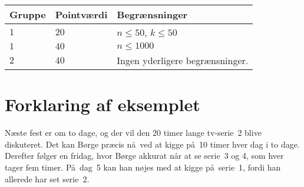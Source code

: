 \noindent
\begin{tabular}{| l | l | l |}
\hline
Gruppe & Pointværdi & Begrænsninger \\ \hline
$1$   & $20$       & $n \leq 50$, $k \leq 50$ \\ \hline
$1$   & $40$       & $n \leq 1000$ \\ \hline
$2$   & $40$       & Ingen yderligere begrænsninger. \\ \hline
\end{tabular}

\section*{Forklaring af eksemplet}
Næste fest er om to dage, og der vil den 20 timer lange tv-serie~2 blive diskuteret.
Det kan Børge præcis nå ved at kigge på 10 timer hver dag i to dage.
Derefter følger en fridag, hvor Børge akkurat når at se serie~3 og 4, som hver tager fem timer.
På dag~5 kan han nøjes med at kigge på serie~1, fordi han allerede har set serie~2.
